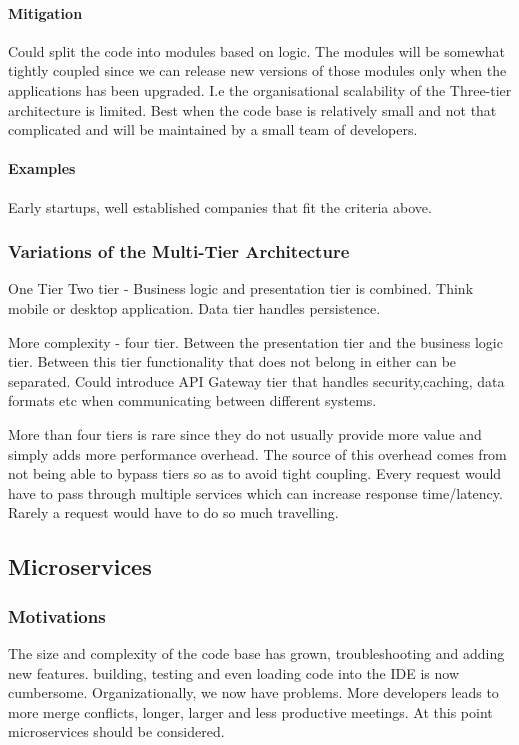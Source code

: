 \documentclass[a4paper, 11pt]{book}
\begin{document}
    \paragraph{Mitigation}
    Could split the code into modules based on logic.
    The modules will be somewhat tightly coupled since we can release new versions of those modules only when the applications has been upgraded.
    I.e the organisational scalability of the Three-tier architecture is limited.
    Best when the code base is relatively small and not that complicated and will be maintained by a small team of developers.

    \paragraph{Examples}
    Early startups, well established companies that fit the criteria above.

    \subsubsection{Variations of the Multi-Tier Architecture}
    One Tier
    Two tier - Business logic and presentation tier is combined.
    Think mobile or desktop application.
    Data tier handles persistence.


    More complexity - four tier.
    Between the presentation tier and the business logic tier.
    Between this tier functionality that does not belong in either can be separated.
    Could introduce API Gateway tier that handles security,caching, data formats etc when communicating between different systems.

    More than four tiers is rare since they do not usually provide more value and simply adds more performance overhead.
    The source of this overhead comes from not being able to bypass tiers so as to avoid tight coupling.
    Every request would have to pass through multiple services which can increase response time/latency.
    Rarely a request would have to do so much travelling.

    \subsection{Microservices}

    \subsubsection{Motivations}
    The size and complexity of the code base has grown, troubleshooting and adding new features.
    building, testing and even loading code into the IDE is now cumbersome.
    Organizationally, we now have problems.
    More developers leads to more merge conflicts, longer, larger and less productive meetings.
    At this point microservices should be considered.
\end{document}
